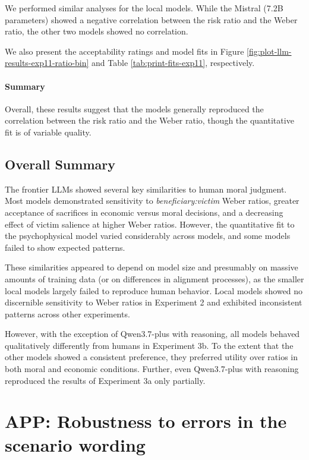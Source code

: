 \documentclass[
]{article}
\begin{document}
We performed similar analyses for the local models. While the Mistral (7.2B parameters) showed a negative correlation between the risk ratio and the Weber ratio, the other two models showed no correlation.

We also present the acceptability ratings and model fits in Figure \ref{fig:plot-llm-results-exp11-ratio-bin} and Table \ref{tab:print-fits-exp11}, respectively.

\paragraph{Summary}\label{summary-2}

Overall, these results suggest that the models generally reproduced the correlation between the risk ratio and the Weber ratio, though the quantitative fit is of variable quality.

\subsection{Overall Summary}\label{overall-summary}

The frontier LLMs showed several key similarities to human moral judgment. Most models demonstrated sensitivity to \emph{beneficiary:victim} Weber ratios, greater acceptance of sacrifices in economic versus moral decisions, and a decreasing effect of victim salience at higher Weber ratios. However, the quantitative fit to the psychophysical model varied considerably across models, and some models failed to show expected patterns.

These similarities appeared to depend on model size and presumably on massive amounts of training data (or on differences in alignment processes), as the smaller local models largely failed to reproduce human behavior. Local models showed no discernible sensitivity to Weber ratios in Experiment 2 and exhibited inconsistent patterns across other experiments.

However, with the exception of Qwen3.7-plus with reasoning, all models behaved qualitatively differently from humans in Experiment 3b. To the extent that the other models showed a consistent preference, they preferred utility over ratios in both moral and economic conditions. Further, even Qwen3.7-plus with reasoning reproduced the results of Experiment 3a only partially.

\clearpage

\section{APP: Robustness to errors in the scenario wording}\label{app:scenario-errors}
\end{document}
